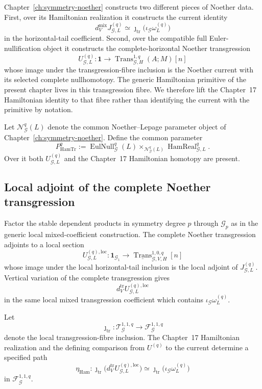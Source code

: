 Chapter~\ref{ch:symmetry-noether} constructs two different pieces of Noether data.
First, over its Hamiltonian realization it constructs the current identity
\[
d_V^{\mathrm{mix}}J_{\mathcal G,L}^{(q)}
\simeq
\jmath_{\mathrm{tr}}
\bigl(\iota_{\mathcal G}\omega_L^{(q)}\bigr)
\]
in the horizontal-tail coefficient.  Second, over the compatible full
Euler-nullification object it constructs the complete-horizontal Noether
transgression
\[
U_{\mathcal G,L}^{(q)}:
\mathbf1\longrightarrow
\operatorname{Trans}^{1,q}_{\mathcal G,H}(A;M)[n]
\]
whose image under the transgression-fibre inclusion is the Noether current with
its selected complete nullhomotopy.  The generic Hamiltonian primitive of the
present chapter lives in this transgression fibre.  We therefore lift the
Chapter~17 Hamiltonian identity to that fibre rather than identifying the current
with the primitive by notation.

Let $\mathcal N_{\mathcal G}^{q}(L)$ denote the common Noether--Lepage parameter
object of Chapter~\ref{ch:symmetry-noether}.  Define the common parameter
\[
P_{\mathrm{HamTr}}^q
:=
\operatorname{EulNull}_{\mathcal G}^{q}(L)
\times_{\mathcal N_{\mathcal G}^{q}(L)}
\operatorname{HamReal}_{\mathcal G,L}^{q}.
\]
Over it both $U_{\mathcal G,L}^{(q)}$ and the Chapter~17 Hamiltonian homotopy are
present.

\subsection{Local adjoint of the complete Noether transgression}
\label{subsec:prequantum-local-noether-current}

Factor the stable dependent products in symmetry degree $p$ through
$\mathcal G_p$ as in the generic local mixed-coefficient construction.  The
complete Noether transgression adjoints to a local section
\[
U_{\mathcal G,L}^{(q),\mathrm{loc}}:
\mathbf1_{\mathcal G_1}
\longrightarrow
\underline{\operatorname{Trans}}^{1,0,q}_{\mathcal G,V,H}[n]
\]
whose image under the local horizontal-tail inclusion is the local adjoint of
$J_{\mathcal G,L}^{(q)}$.  Vertical variation of the complete transgression gives
\[
d_V^{\mathrm{tr}}U_{\mathcal G,L}^{(q),\mathrm{loc}}
\]
in the same local mixed transgression coefficient which contains
$\iota_{\mathcal G}\omega_L^{(q)}$.

Let
\[
\jmath_{\mathrm{tr}}:
\mathscr T_{\mathcal G}^{1,1,q}
\longrightarrow
\mathscr F_{\mathcal G}^{1,1,q}
\]
denote the local transgression-fibre inclusion.  The Chapter~17 Hamiltonian
realization and the defining comparison from $U^{(q)}$ to the current determine a
specified path
\[
\eta_{\mathrm{Ham}}:
\jmath_{\mathrm{tr}}
\bigl(d_V^{\mathrm{tr}}U_{\mathcal G,L}^{(q),\mathrm{loc}}\bigr)
\simeq
\jmath_{\mathrm{tr}}
\bigl(\iota_{\mathcal G}\omega_L^{(q)}\bigr)
\]
in $\mathscr F_{\mathcal G}^{1,1,q}$.

